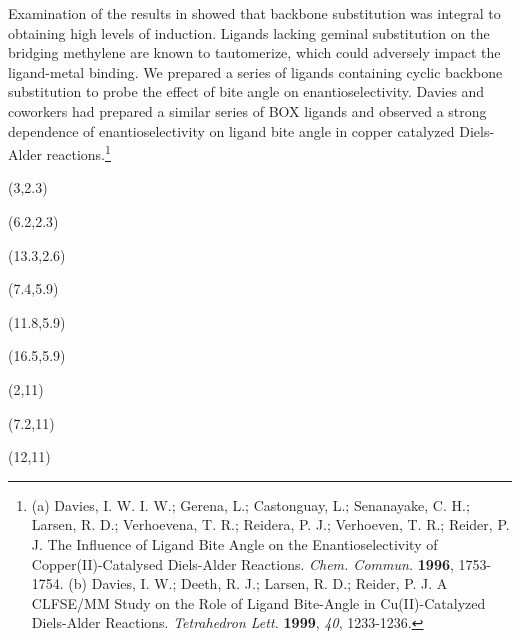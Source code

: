 Examination of the results in  showed that backbone substitution was
integral to obtaining high levels of induction. Ligands lacking geminal substitution on the bridging
methylene are known to tautomerize, which could adversely impact the ligand-metal
binding. We prepared a series of ligands containing cyclic backbone
substitution to probe the effect of bite angle on enantioselectivity. Davies and coworkers had
prepared a similar series of BOX ligands and observed a strong dependence of enantioselectivity on ligand bite
angle in copper catalyzed Diels-Alder reactions.\footnote{(a) {\frenchspacing Davies, I. W. I. W.;
Gerena, L.; Castonguay, L.; Senanayake, C.
H.; Larsen, R. D.; Verhoevena, T. R.; Reidera, P. J.; Verhoeven, T. R.; Reider, P. J. The Influence
of Ligand Bite Angle on the Enantioselectivity of Copper(II)-Catalysed Diels-Alder Reactions.
\textit{Chem. Commun.} \textbf{1996}, 1753-1754.} (b) {\frenchspacing Davies, I. W.; Deeth, R. J.;
Larsen, R. D.; Reider, P. J. A CLFSE/MM Study on the Role of Ligand Bite-Angle in Cu(II)-Catalyzed
Diels-Alder Reactions. \textit{Tetrahedron Lett.} \textbf{1999}, \textit{40}, 1233-1236.}\label{ref:asdaviesdielsalder}} \begin{Scheme}[p]
  \centering
  \begin{textblock}{1}(3,2.3)  \end{textblock}
  \begin{textblock}{1}(6.2,2.3)  \end{textblock}
  \begin{textblock}{1}(13.3,2.6)  \end{textblock}
   \begin{textblock}{1}(7.4,5.9)  \end{textblock}
    \begin{textblock}{1}(11.8,5.9)  \end{textblock}
     \begin{textblock}{1}(16.5,5.9)  \end{textblock}
   \begin{textblock}{1}(2,11)  \end{textblock}
    \begin{textblock}{1}(7.2,11)  \end{textblock}
     \begin{textblock}{1}(12,11)  \end{textblock}

\end{Scheme}
